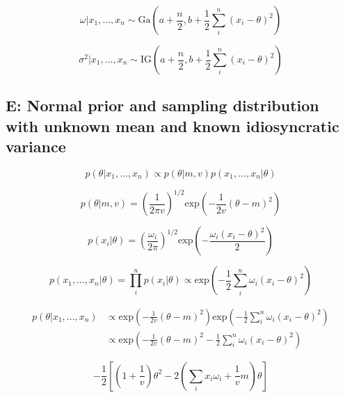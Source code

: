 \documentclass[12pt]{article}
\begin{document}
        \begin{equation}
              \omega | x_1,...,x_n \sim \text{Ga}\left (a + \frac{n}{2}, b+ \frac{1}{2}\sum_i^n(x_i - \theta)^2\right )
        \end{equation}

        \begin{equation}
              \sigma^2 | x_1,...,x_n \sim \text{IG}\left (a + \frac{n}{2}, b+ \frac{1}{2}\sum_i^n(x_i - \theta)^2\right )
        \end{equation}

    \subsection*{E: Normal prior and sampling distribution with unknown mean and known idiosyncratic variance}

        \begin{equation}
              p(\theta|x_1,..., x_n) \propto p(\theta|m,v)p(x_1,...,x_n|\theta)
        \end{equation}

        \begin{equation}
              p(\theta|m,v) = \left(\frac{1}{2 \pi v} \right )^{1/2} \text{exp}\left( - \frac{1}{2v} (\theta - m)^2\right )
        \end{equation}

        \begin{equation}
              p(x_i|\theta) = \left(\frac{\omega_i}{2 \pi} \right )^{1/2} \text{exp}\left( - \frac{\omega_i(x_i - \theta)^2}{2} \right )
        \end{equation}

        \begin{equation}
              p(x_1,...,x_n|\theta) = \prod_i^n p(x_i|\theta) \propto \text{exp}\left( - \frac{1}{2} \sum_i^n\omega_i(x_i - \theta)^2 \right )
        \end{equation}

        \begin{align}
            p(\theta|x_1,...,x_n) &\propto \text{exp}\left( - \frac{1}{2v} (\theta - m)^2\right) \text{exp}\left( - \frac{1}{2} \sum_i^n\omega_i(x_i - \theta)^2\right)\\
            &\propto \text{exp}\left(-\frac{1}{2v}(\theta - m)^2 - \frac{1}{2} \sum_i^n\omega_i(x_i - \theta)^2\right)
        \end{align}

        \begin{equation}
            -\frac{1}{2} \left[ \left(1 + \frac{1}{v} \right) \theta^2 - 2 \left ( \sum_i x_i \omega_i + \frac{1}{v}m\right) \theta\right]
        \end{equation}
\end{document}
